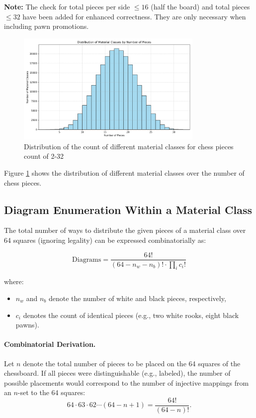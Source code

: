 \documentclass[12pt]{article}
\begin{document}
\noindent
\textbf{Note:} The check for total pieces per side $\leq 16$ (half the board) and total
pieces $\leq 32$ have been added for enhanced correctness. They are only necessary when including pawn promotions.

\begin{figure}[h!]
  \centering
  \includegraphics[width=0.8\textwidth]{material_class_histogram.png}
  \caption{Distribution of the count of different material classes for chess pieces count of 2-32}
  \label{fig:material_class_hist}
\end{figure}
Figure \ref{fig:material_class_hist} shows the distribution of different material classes over the number of chess pieces.
\subsection{Diagram Enumeration Within a Material Class}

The total number of ways to distribute the given pieces of a material class over 64 squares (ignoring legality) can be expressed combinatorially as:

\[
\text{Diagrams} = \frac{64!}{(64 - n_w - n_b)! \cdot \prod_i c_i!}
\]

where:
\begin{itemize}
\item $n_w$ and $n_b$ denote the number of white and black pieces, respectively,
\item $c_i$ denotes the count of identical pieces (e.g., two white rooks, eight black pawns).
\end{itemize}

\paragraph{Combinatorial Derivation.}
Let \(n\) denote the total number of pieces to be placed on the 64 squares of the chessboard.  
If all pieces were distinguishable (e.g., labeled), the number of possible placements would correspond to the number of injective mappings from an \(n\)-set to the 64 squares:
\[
64 \cdot 63 \cdot 62 \cdots (64 - n + 1) = \frac{64!}{(64 - n)!}.
\]
\end{document}
